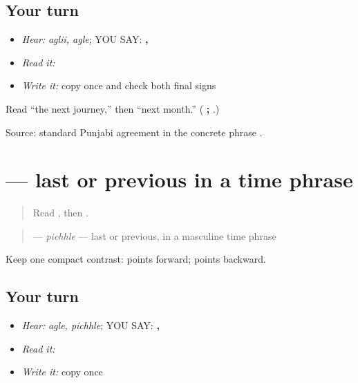 \subsection*{Your turn}
\begin{itemize}
\raggedright
  \item \emph{Hear:} \emph{aglii, agle}; YOU SAY: \textbf{, }
  \item \emph{Read it:} \textbf{ }
  \item \emph{Write it:} copy \textbf{ } once and check both final \textbf{} signs
\end{itemize}

\begin{tcolorbox}[breakable,colback=teal!4,colframe=teal!35!black,title={Before you move on}]
Read “the next journey,” then “next month.” (\textbf{ ;  }.)

Source: standard Punjabi agreement in the concrete phrase \textbf{ }.
\end{tcolorbox}
\section[\texorpdfstring{\pa{ਪਿਛਲੇ} (pichhle)}{ਪਿਛਲੇ (pichhle)}]{ — last or previous in a time phrase}

\label{lesson:PA-C184-pichhle}



\begin{quote}
Read \textbf{}, then \textbf{}.
\end{quote}

\begin{grammarlens}[title={Grammar Lens: point backward instead of forward}]
\begin{quote}
\textbf{} — \emph{pichhle} — last or previous, in a masculine time phrase
\end{quote}

Keep one compact contrast: \textbf{ } points forward; \textbf{ } points backward.
\end{grammarlens}

\subsection*{Your turn}
\begin{itemize}
\raggedright
  \item \emph{Hear:} \emph{agle, pichhle}; YOU SAY: \textbf{, }
  \item \emph{Read it:} \textbf{ }
  \item \emph{Write it:} copy \textbf{ } once
\end{itemize}

